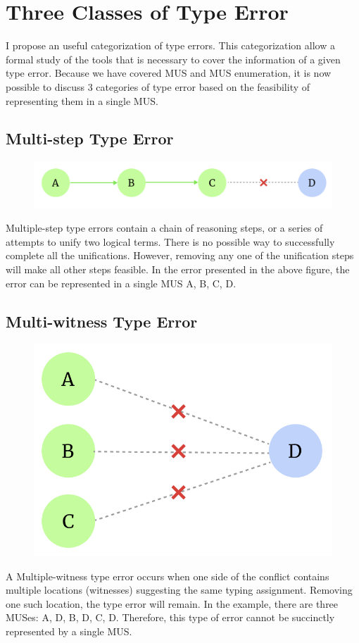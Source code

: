 \section{Three Classes of Type Error}

I propose an useful categorization of type errors. This categorization allow a formal study of the tools that is necessary to cover the information of a given type error.  Because we have covered MUS and MUS enumeration, it is now possible to discuss 3 categories of type error based on the feasibility of representing them in a single MUS.

\subsection{Multi-step Type Error}
\begin{figure}
  \includegraphics[width=\linewidth]{Multi-step}
  \caption{}
\end{figure}

Multiple-step type errors contain a chain of reasoning steps, or a series of attempts to unify two logical terms. There is no possible way to successfully complete all the unifications. However, removing any one of the unification steps will make all other steps feasible. In the error presented in the above figure, the error can be represented in a single MUS {A, B, C, D}.

\subsection{Multi-witness Type Error}
\begin{figure}
  \includegraphics[width=\linewidth]{Multi-witness}
  \caption{}
\end{figure}
A Multiple-witness type error occurs when one side of the conflict contains multiple locations (witnesses) suggesting the same typing assignment. Removing one such location, the type error will remain. In the example, there are three MUSes: {A, D}, {B, D}, {C, D}. Therefore, this type of error cannot be succinctly represented by a single MUS.

